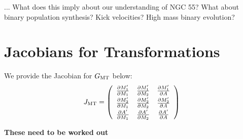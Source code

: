 \documentclass[12pt, preprint]{aastex}
\begin{document}
... What does this imply about our understanding of NGC 55? What about binary population synthesis? Kick velocities? High mass binary evolution?



\appendix

\section{Jacobians for Transformations}

We provide the Jacobian for $G_{\rm MT}$ below:
\[  J_{\rm MT} = \left( \begin{array}{ccc}
\frac{\partial M_1'}{\partial M_1} & \frac{\partial M_1'}{\partial M_2} & \frac{\partial M_1'}{\partial A}  \\[0.3em]
\frac{\partial M_2'}{\partial M_1}  & \frac{\partial M_2'}{\partial M_2} & \frac{\partial M_2'}{\partial A} \\[0.3em]
\frac{\partial A'}{\partial M_1} & \frac{\partial A'}{\partial M_2} & \frac{\partial A'}{\partial A}  \end{array} \right)\]

{\bf These need to be worked out}
\end{document}
